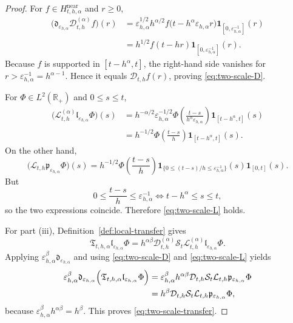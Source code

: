 \documentclass[11pt,a4paper]{amsart}
\theoremstyle{plain}
\theoremstyle{definition}
\theoremstyle{remark}
\newcommand{\R}{\mathbb{R}}
\newcommand{\one}{\mathbf 1}
\begin{document}
\begin{proof}
For \(f\in H_{t,h,\alpha}^{\mathrm{near}}\) and \(r\ge0\),
\begin{align*}
\bigl(\mathfrak d_{\varepsilon_{h,\alpha}}\mathcal D_{t,h}^{(\alpha)}f\bigr)(r)
&=
\varepsilon_{h,\alpha}^{1/2}
h^{\alpha/2}
f\bigl(t-h^\alpha \varepsilon_{h,\alpha}r\bigr)\one_{[0,\varepsilon_{h,\alpha}^{-1}]}(r) \\
&=
h^{1/2}f(t-hr)\one_{[0,\varepsilon_{h,\alpha}^{-1}]}(r).
\end{align*}
Because \(f\) is supported in \([t-h^\alpha,t]\), the right-hand side vanishes for
\(r>\varepsilon_{h,\alpha}^{-1}=h^{\alpha-1}\). Hence it equals \(\mathcal D_{t,h}f(r)\), proving
\eqref{eq:two-scale-D}.

For \(\Phi\in L^2(\R_+)\) and \(0\le s\le t\),
\begin{align*}
\bigl(\mathcal L_{t,h}^{(\alpha)}\mathfrak l_{\varepsilon_{h,\alpha}}\Phi\bigr)(s)
&=
h^{-\alpha/2}
\varepsilon_{h,\alpha}^{-1/2}
\Phi\!\left(\frac{t-s}{h^\alpha\varepsilon_{h,\alpha}}\right)
\one_{[t-h^\alpha,t]}(s) \\
&=
h^{-1/2}
\Phi\!\left(\frac{t-s}{h}\right)
\one_{[t-h^\alpha,t]}(s).
\end{align*}
On the other hand,
\[
\bigl(\mathcal L_{t,h}\mathfrak p_{\varepsilon_{h,\alpha}}\Phi\bigr)(s)
=
h^{-1/2}
\Phi\!\left(\frac{t-s}{h}\right)
\one_{\{0\le (t-s)/h\le \varepsilon_{h,\alpha}^{-1}\}}(s)\one_{[0,t]}(s).
\]
But
\[
0\le \frac{t-s}{h}\le \varepsilon_{h,\alpha}^{-1}
\iff
t-h^\alpha\le s\le t,
\]
so the two expressions coincide. Therefore \eqref{eq:two-scale-L} holds.

For part (iii), Definition~\ref{def:local-transfer} gives
\[
\mathfrak T_{t,h,\alpha}\mathfrak l_{\varepsilon_{h,\alpha}}\Phi
=
h^{\alpha\beta}
\mathcal D_{t,h}^{(\alpha)}
\mathcal S_t
\mathcal L_{t,h}^{(\alpha)}
\mathfrak l_{\varepsilon_{h,\alpha}}\Phi.
\]
Applying \(\varepsilon_{h,\alpha}^{\beta}\mathfrak d_{\varepsilon_{h,\alpha}}\) and using
\eqref{eq:two-scale-D} and \eqref{eq:two-scale-L} yields
\begin{align*}
\varepsilon_{h,\alpha}^{\beta}
\mathfrak d_{\varepsilon_{h,\alpha}}
\Bigl(
\mathfrak T_{t,h,\alpha}\mathfrak l_{\varepsilon_{h,\alpha}}\Phi
\Bigr)
&=
\varepsilon_{h,\alpha}^{\beta}h^{\alpha\beta}
\mathcal D_{t,h}
\mathcal S_t
\mathcal L_{t,h}
\mathfrak p_{\varepsilon_{h,\alpha}}\Phi \\
&=
h^\beta
\mathcal D_{t,h}\mathcal S_t\mathcal L_{t,h}\mathfrak p_{\varepsilon_{h,\alpha}}\Phi,
\end{align*}
because \(\varepsilon_{h,\alpha}^{\beta}h^{\alpha\beta}=h^\beta\). This proves
\eqref{eq:two-scale-transfer}.
\end{proof}
\end{document}
